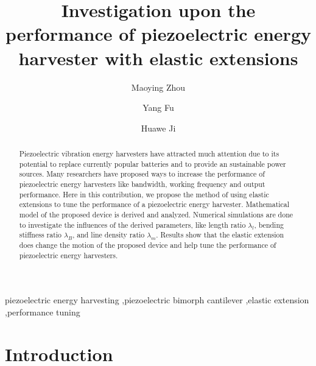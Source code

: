 \documentclass{elsarticle}
\begin{document}
\title{Investigation upon the performance of piezoelectric energy harvester with elastic extensions}

\author[1]{Maoying Zhou}
\author[2,3]{Yang Fu }
\author[1]{Huawe Ji}


\address[1]{School of Mechanical Engineering, Hangzhou Dianzi University, Hangzhou, China}
\address[2]{School of Mechanical and Automotive Engineering, Zhejiang University of Science and Technology, Hangzhou, China}
\address[3]{The State Key Laboratory of Fluid Power and Mechatronic Systems, Zhejiang University, Hangzhou, China}


\begin{abstract}

Piezoelectric vibration energy harvesters have attracted much attention due to its potential to replace currently popular batteries and to provide an sustainable power sources. Many researchers have proposed ways to increase the performance of piezoelectric energy harvesters like bandwidth, working frequency and output performance. Here in this contribution, we propose the method of using elastic extensions to tune the performance of a piezoelectric energy harvester. Mathematical model of the proposed device is derived and analyzed. Numerical simulations are done to investigate the influences of the derived parameters, like length ratio $\lambda_l$, bending stiffness ratio $\lambda_B$, and line density ratio $\lambda_m$. Results show that the elastic extension does change the motion of the proposed device and help tune the performance of piezoelectric energy harvesters. 

\end{abstract}

\begin{keyword}
piezoelectric energy harvesting \sep piezoelectric bimorph cantilever \sep elastic extension \sep performance tuning
\end{keyword}

\maketitle


\section{Introduction}
\end{document}

